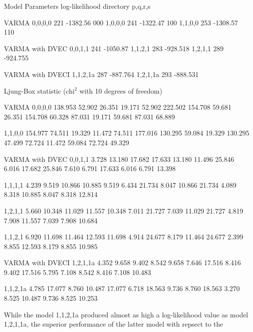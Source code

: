 {\obeylines\obeyspaces
Model Parameters  log-likelihood  directory
p,q,r,s

VARMA
0,0,0,0   221         -1382.56      000
1,0,0,0   241         -1322.47      100
1,1,0,0   253         -1308.57      110

VARMA with DVEC
0,0,1,1   241         -1050.87 
1,1,2,1   283         -928.518 
1,2,1,1   289         -924.755  

VARMA with DVECI
1,1,2,1a  287         -887.764 
1,2,1,1a  293         -888.531 

Ljung-Box statistic (chi${}^2$ with 10 degrees of freedom)


VARMA
0,0,0,0         138.953  52.902  26.351 19.171
                 52.902 222.502 154.708 59.681
                 26.351 154.708  60.328 87.031
                 19.171  59.681  87.031 68.889


1,1,0,0         154.977  74.511  19.329 11.472
                 74.511 177.016 130.295 59.084
                 19.329 130.295  47.499 72.724
                 11.472  59.084  72.724 49.329

VARMA with DVEC
0,0,1,1           3.728 13.180 17.682 17.633
                 13.180 11.496 25.846  6.016
                 17.682 25.846  7.610  6.791
                 17.633  6.016  6.791 13.398


1,1,1,1           4.239  9.519 10.866 10.885
                  9.519  6.434 21.734  8.047
                 10.866 21.734  4.089  8.318
                 10.885  8.047  8.318 12.814

1,2,1,1           5.660 10.348 11.029 11.557
                 10.348  7.011 21.727  7.039
                 11.029 21.727  4.819  7.908
                 11.557  7.039  7.908 10.684

1,1,2,1           6.920 11.698 11.464 12.593
                 11.698  4.914 24.677  8.179
                 11.464 24.677  2.399  8.855
                 12.593  8.179 8.855 10.985

VARMA with DVECI
1,2,1,1a          4.352  9.658  9.402  8.542
                  9.658  7.646 17.516  8.416
                  9.402 17.516  5.795  7.108
                  8.542  8.416  7.108 10.483

1,1,2,1a          4.785 17.077  8.760 10.487
                 17.077  6.718 18.563  9.736
                  8.760 18.563  3.270  8.525
                 10.487  9.736  8.525 10.253
}
While the model 1,1,2,1a produced almost as high a
log-likelihood value as model 1,2,1,1a, the superior
performance of the latter model with repsect to the 
